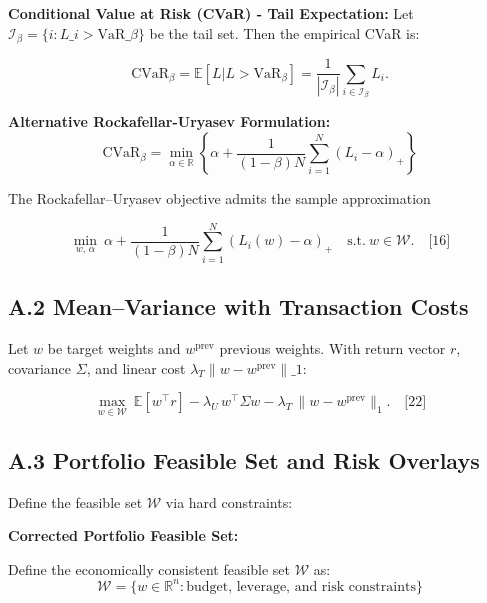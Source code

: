 \documentclass[11pt,a4paper]{article}
\begin{document}
\textbf{Conditional Value at Risk (CVaR) - Tail Expectation:}
Let $\mathcal{I}_\beta=\{i: L\_i > \mathrm{VaR}\_\beta\}$ be the tail set. Then the empirical CVaR is:

\begin{equation}
\mathrm{CVaR}_\beta = \mathbb{E}[L | L > \mathrm{VaR}_\beta] = \frac{1}{|\mathcal{I}_\beta|}\sum_{i\in\mathcal{I}_\beta} L_i.
\end{equation}

\textbf{Alternative Rockafellar-Uryasev Formulation:}
\begin{equation}
\mathrm{CVaR}_\beta = \min_{\alpha \in \mathbb{R}} \left\{ \alpha + \frac{1}{(1-\beta)N}\sum_{i=1}^N (L_i-\alpha)_+ \right\}
\end{equation}

The Rockafellar–Uryasev objective admits the sample approximation

\begin{equation}
\min_{w,\,\alpha}\ \alpha + \frac{1}{(1-\beta)N}\sum_{i=1}^N (L_i(w)-\alpha)_+\quad\text{s.t.}\ w\in\mathcal{W}.\quad\text{[16]}
\end{equation}

\subsection{A.2 Mean–Variance with Transaction Costs}

Let $w$ be target weights and $w^{\text{prev}}$ previous weights. With return vector $r$, covariance $\Sigma$, and linear cost $\lambda_T\|w-w^{\text{prev}}\|\_1$:

\begin{equation}
\max_{w\in\mathcal{W}}\ \mathbb{E}[w^\top r] - \lambda_U\, w^\top\Sigma w - \lambda_T\,\|w-w^{\text{prev}}\|_1.\quad\text{[22]}
\end{equation}

\subsection{A.3 Portfolio Feasible Set and Risk Overlays}

Define the feasible set $\mathcal{W}$ via hard constraints:

\textbf{Corrected Portfolio Feasible Set:}

Define the economically consistent feasible set $\mathcal{W}$ as:
\begin{equation}
\mathcal{W} = \{w \in \mathbb{R}^n : \text{budget, leverage, and risk constraints}\}
\end{equation}
\end{document}
